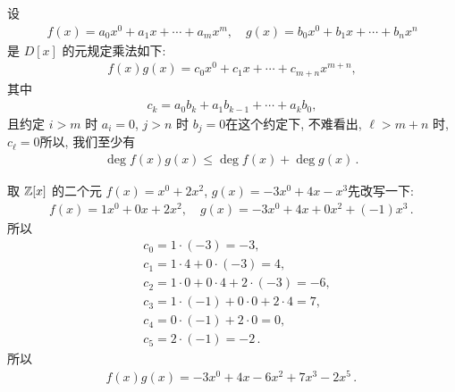 \begin{definition}
    设
    \begin{align*}
        f(x) = a_0 x^0 + a_1 x + \cdots + a_m x^m, \quad g(x) = b_0 x^0 + b_1 x + \cdots + b_n x^n
    \end{align*}
    是 $D[x]$ 的元\period 规定乘法如下:
    \begin{align*}
        f(x) g(x) = c_0 x^0 + c_1 x + \cdots + c_{m+n} x^{m+n},
    \end{align*}
    其中
    \begin{align*}
        c_k = a_0 b_k + a_1 b_{k-1} + \cdots + a_k b_0,
    \end{align*}
    且约定 $i > m$ 时 $a_i = 0$, $j > n$ 时 $b_j = 0$\period 在这个约定下, 不难看出, $\ell > m+n$ 时, $c_\ell = 0$\period 所以, 我们至少有
    \begin{align*}
        \deg f(x)g(x) \leq \deg f(x) + \deg g(x) \period
    \end{align*}
\end{definition}

\begin{example}
    取 $\mathbb{Z}[x]$ 的二个元 $f(x)=x^0 + 2x^2$, $g(x)=-3x^0 + 4x - x^3$\period 先改写一下:
    \begin{align*}
        f(x) = 1x^0 + 0x + 2x^2, \quad g(x) = -3x^0 + 4x + 0x^2 + (-1)x^3 \period
    \end{align*}
    所以
    \begin{align*}
         & c_0 = 1 \cdot (-3) = -3,                         \\
         & c_1 = 1 \cdot 4 + 0 \cdot (-3) = 4,              \\
         & c_2 = 1 \cdot 0 + 0 \cdot 4 + 2 \cdot (-3) = -6, \\
         & c_3 = 1 \cdot (-1) + 0 \cdot 0 + 2 \cdot 4 = 7,  \\
         & c_4 = 0 \cdot (-1) + 2 \cdot 0 = 0,              \\
         & c_5 = 2 \cdot (-1) = -2 \period
    \end{align*}
    所以
    \begin{align*}
        f(x) g(x) = -3x^0 + 4x - 6x^2 + 7x^3 - 2x^5 \period
    \end{align*}
\end{example}


